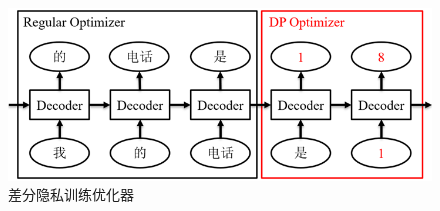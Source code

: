 

\begin{figure}[h]
	\centering
	\includegraphics[width=0.7\linewidth]{figures/SDP_Optim.png}
	\caption{差分隐私训练优化器}
	\label{SDP_Optim}
\end{figure}


%	
%	
%		
%		
%		
%		
%			
%			
%			
%			
%			
%			
%			
%			
%			
%			
%			
%			
%			
%			
%			
%			
%			
%			
%			
%		
%	

